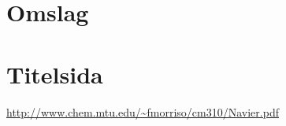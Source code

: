 \documentclass{article}
\begin{document}
\section{Omslag}
\section{Titelsida}

\begin{thebibliography}{10}

\url{http://www.chem.mtu.edu/~fmorriso/cm310/Navier.pdf}

\end{thebibliography}
\end{document}
